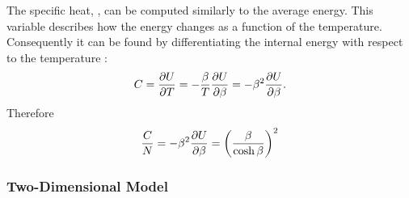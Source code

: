 	The specific heat, \specificHeat, can be computed similarly to the average energy. This variable describes how the energy changes as a function of the temperature. Consequently it can be found by differentiating the internal energy with respect to the temperature \cite{warkHandout}:
	\begin{equation}
		C 
		= \frac{\partial U}{\partial T} 
		= - \frac{\beta}{T} \frac{\partial U}{\partial \beta} 
		= - \beta^2 \frac{\partial U}{\partial \beta}.
	\end{equation}
	Therefore
	\begin{equation}
		\frac{C}{N} = - \beta^2 \frac{\partial U}{\partial \beta}  = {\left( \frac{\beta}{\cosh \beta} \right)}^2
	\end{equation}
 
\subsubsection{Two-Dimensional Model}
	\label{sss:intro:ising:2D}
